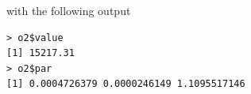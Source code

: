 with the following output

\begin{verbatim}
> o2$value
[1] 15217.31
> o2$par
[1] 0.0004726379 0.0000246149 1.1095517146
\end{verbatim}



